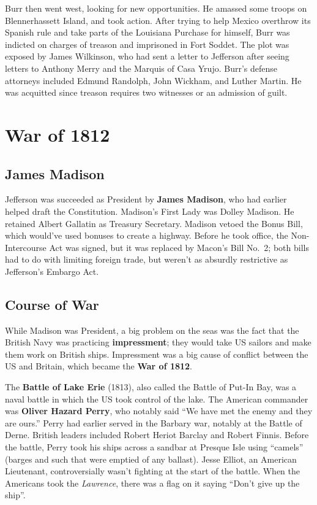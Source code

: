 Burr then went west, looking for new opportunities.
He amassed some troops on Blennerhassett Island, and took action.
After trying to help Mexico overthrow its Spanish rule
and take parts of the Louisiana Purchase for himself,
Burr was indicted on charges of treason and imprisoned in Fort Soddet.
The plot was exposed by James Wilkinson,
who had sent a letter to Jefferson
after seeing letters to Anthony Merry and the Marquis of Casa Yrujo.
Burr's defense attorneys included Edmund Randolph, John Wickham, and Luther Martin.
He was acquitted since treason requires two witnesses or an admission of guilt.

\section{War of 1812}

\subsection*{James Madison}

Jefferson was succeeded as President by \textbf{James Madison},
who had earlier helped draft the Constitution.
Madison's First Lady was Dolley Madison.
He retained Albert Gallatin as Treasury Secretary.
Madison vetoed the Bonus Bill, which would've used bonuses to create a highway.
Before he took office, the Non-Intercourse Act was signed,
but it was replaced by Macon's Bill No.\ 2;
both bills had to do with limiting foreign trade,
but weren't as absurdly restrictive as Jefferson's Embargo Act.

\subsection*{Course of War}

While Madison was President,
a big problem on the seas was the fact that the British Navy was practicing \textbf{impressment};
they would take US sailors and make them work on British ships.
Impressment was a big cause of conflict between the US and Britain,
which became the \textbf{War of 1812}.

The \textbf{Battle of Lake Erie} (1813), also called the Battle of Put-In Bay,
was a naval battle in which the US took control of the lake.
The American commander was \textbf{Oliver Hazard Perry}, who notably said
``We have met the enemy and they are ours.''
Perry had earlier served in the Barbary war, notably at the Battle of Derne.
British leaders included Robert Heriot Barclay and Robert Finnis.
Before the battle, Perry took his ships across a sandbar at Presque Isle using ``camels''
(barges and such that were emptied of any ballast).
Jesse Elliot, an American Lieutenant, controversially wasn't fighting at the start of the battle.
When the Americans took the \textit{Lawrence},
there was a flag on it saying ``Don't give up the ship''.

